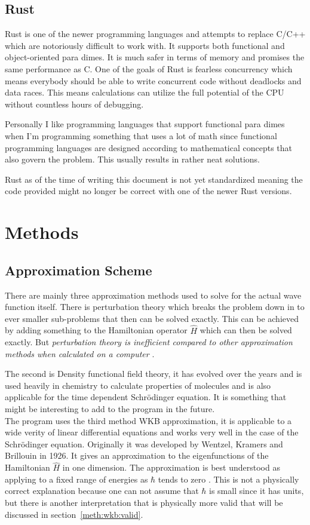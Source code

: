 \documentclass[11pt,DIV=10,final]{scrreprt} %
\begin{document}
\section{Rust}
Rust is one of the newer programming languages and attempts to replace C/C++ which are notoriously difficult to work with. It supports both functional and object-oriented para dimes. It is much safer in terms of memory and promises the same performance as C. One of the goals of Rust is fearless concurrency which means everybody should
be able to write concurrent code without deadlocks and data races. This means calculations can utilize the full potential of the CPU without countless hours of debugging.

Personally I like programming languages that support functional para dimes when I'm programming something that uses a lot of math since functional programming languages are designed according to mathematical concepts that also govern the problem. This usually results in rather neat solutions.

Rust as of the time of writing this document is not yet standardized meaning the code provided might no longer be correct with one of the newer Rust versions.

\chapter{Methods}
\section{Approximation Scheme}
\label{meth:wkb:approximation-scheme}
There are mainly three approximation methods used to solve for the actual wave function itself. There is perturbation theory which breaks the problem down in to ever smaller sub-problems that then can be
solved exactly. This can be achieved by adding something to the Hamiltonian operator $\hat{H}$ which can then be solved exactly. But \textit{perturbation theory is inefficient compared to other approximation
methods when calculated on a computer} \citep[Introduction]{van2014density}.

The second is Density functional field theory, it has evolved over the years and is used heavily in chemistry to calculate properties of molecules and is also applicable for the time dependent Schrödinger
equation. It is something that might be interesting to add to the program in the future.
\\

The program uses the third method WKB approximation, it is applicable to a wide verity of linear differential equations and works very well in the case of the Schrödinger equation.
Originally it was developed by Wentzel, Kramers and Brillouin in 1926. It gives an approximation to the eigenfunctions of the Hamiltonian $\hat{H}$ in one dimension. The approximation is best
understood as applying to a fixed range of energies as $\hbar$ tends to zero \citep[p.~305]{hall2013quantum}. This is not a physically correct explanation because one can not assume that $\hbar$ is small since it has units, but there is another interpretation that is physically more valid that will be discussed in section~\ref{meth:wkb:valid}.
\end{document}
